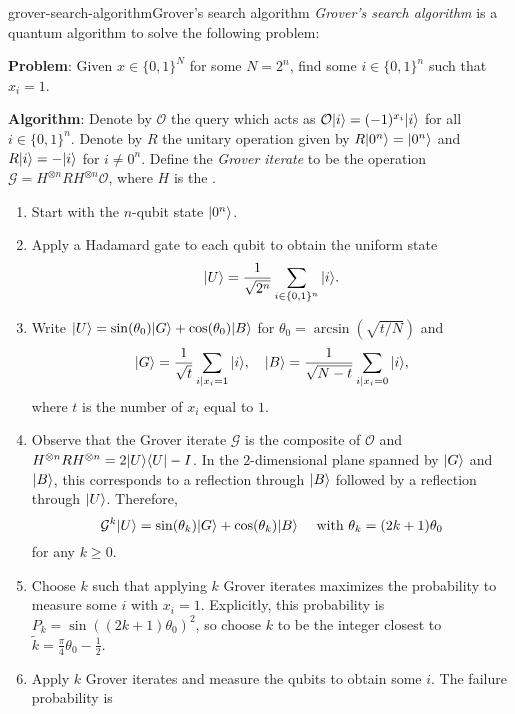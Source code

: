 \begin{topic}{grover-search-algorithm}{Grover's search algorithm}
    \emph{Grover's search algorithm} is a quantum algorithm to solve the following problem:

    \textbf{Problem}: Given $x \in \{ 0, 1 \}^N$ for some $N = 2^n$, find some $i \in \{ 0, 1 \}^n$ such that $x_i = 1$.

    \textbf{Algorithm}: Denote by $\mathcal{O}$ the query which acts as $\mathcal{O} |i\rangle = (-1)^{x_i} |i\rangle$ for all $i \in \{ 0, 1 \}^n$. Denote by $R$ the unitary operation given by $R |0^n\rangle = |0^n\rangle$ and $R |i\rangle = - |i\rangle$ for $i \ne 0^n$. Define the \textit{Grover iterate} to be the operation $\mathcal{G} = H^{\otimes n} R H^{\otimes n} \mathcal{O}$, where $H$ is the .
    \begin{enumerate}[label=(\arabic*)]
        \item Start with the $n$-qubit state $|0^n\rangle$.
        \item Apply a Hadamard gate to each qubit to obtain the uniform state
        \[ |U\rangle = \frac{1}{\sqrt{2^n}} \sum_{i \in \{ 0, 1 \}^n } |i\rangle . \]
        \item Write $|U\rangle = \sin(\theta_0) |G\rangle + \cos(\theta_0) |B\rangle$ for $\theta_0 = \arcsin(\sqrt{t / N})$ and
        \[ |G\rangle = \frac{1}{\sqrt{t}} \sum_{i \mid x_i = 1} |i\rangle, \quad |B\rangle = \frac{1}{\sqrt{N - t}} \sum_{i \mid x_i = 0} |i\rangle , \]
        where $t$ is the number of $x_i$ equal to $1$.
        \item Observe that the Grover iterate $\mathcal{G}$ is the composite of $\mathcal{O}$ and $H^{\otimes n} R H^{\otimes n} = 2 |U\rangle \langle U| - I$. In the $2$-dimensional plane spanned by $|G\rangle$ and $|B\rangle$, this corresponds to a reflection through $|B\rangle$ followed by a reflection through $|U\rangle$. Therefore,
        \[ \mathcal{G}^k |U\rangle = \sin(\theta_k) |G\rangle + \cos(\theta_k) |B\rangle \quad \textup{ with } \theta_k = (2k + 1) \theta_0 \]
        for any $k \ge 0$.
        \item Choose $k$ such that applying $k$ Grover iterates maximizes the probability to measure some $i$ with $x_i = 1$. Explicitly, this probability is $P_k = \sin((2k + 1) \theta_0)^2$, so choose $k$ to be the integer closest to $\tilde{k} = \tfrac{\pi}{4} \theta_0 - \tfrac{1}{2}$.
        \item Apply $k$ Grover iterates and measure the qubits to obtain some $i$. The failure probability is
        \[ \begin{aligned}

\end{aligned}\]
\end{enumerate}
\end{topic}

